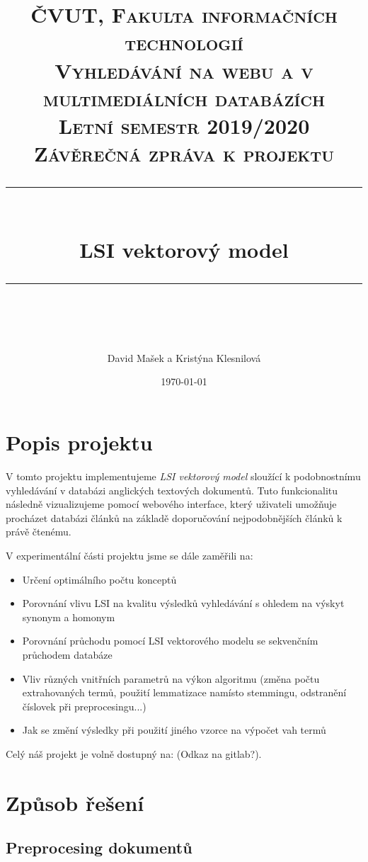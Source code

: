 \documentclass[11pt]{scrartcl} %
\title{	
	\normalfont\normalsize
	\textsc{ČVUT, Fakulta informačních technologií}\\ %
	\textsc{Vyhledávání na webu a v multimediálních databázích}\\
	\textsc{Letní semestr 2019/2020}\\
	\textsc{Závěrečná zpráva k projektu}\\
	\vspace{25pt} %
	\rule{\linewidth}{0.5pt}\\ %
	\vspace{20pt} %
	{\huge LSI vektorový model}\\ %
	\vspace{12pt} %
	\rule{\linewidth}{2pt}\\ %
	\vspace{12pt} %
}
\author{\LARGE David Mašek a Kristýna Klesnilová} %
\date{\normalsize\today} %
\begin{document}
\maketitle %

\newpage

\tableofcontents

\newpage

\section{Popis projektu}

V tomto projektu implementujeme \emph{LSI vektorový model} sloužící k podobnostnímu vyhledávání v databázi anglických textových dokumentů. Tuto funkcionalitu následně vizualizujeme pomocí webového interface, který uživateli umožňuje procházet databázi článků na základě doporučování nejpodobnějších článků k právě čtenému.

\bigskip 

V experimentální části projektu jsme se dále zaměřili na:
\begin{itemize}
	\item Určení optimálního počtu konceptů
	\item Porovnání vlivu LSI na kvalitu výsledků vyhledávání s ohledem na výskyt synonym a homonym
	\item Porovnání průchodu pomocí LSI vektorového modelu se sekvenčním průchodem databáze
	\item Vliv různých vnitřních parametrů na výkon algoritmu (změna počtu extrahovaných termů, použití lemmatizace namísto stemmingu, odstranění číslovek při preprocesingu...)
	\item Jak se změní výsledky při použití jiného vzorce na výpočet vah termů
\end{itemize}

\bigskip 

Celý náš projekt je volně dostupný na: (Odkaz na gitlab?).

\section{Způsob řešení}

\subsection{Preprocesing dokumentů}
\end{document}
